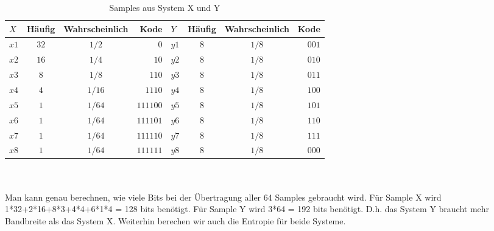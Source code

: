 \begin{table}[h]
  \begin{center}
    \begin{tabular}{lccrlccr}
      \toprule
      \bf $X$ & \bf H\"aufig & \bf Wahrscheinlich & \bf Kode 
   	& \bf $Y$ & \bf H\"aufig & \bf Wahrscheinlich & \bf Kode\\    
      \midrule     
      $x1$ 		&  $32$ 		 	& $1/2$  							& $0$	
    & $y1$		&  $8$ 		 		& $1/8$  							& $001$	\\
      $x2$ 		&  $16$ 			& $1/4$  							& $10$
    & $y2$		&  $8$ 		 		& $1/8$  							& $010$	\\
     	$x3$ 		&  $8$ 		 		& $1/8$  							& $110$	
    & $y3$		&  $8$ 		 		& $1/8$  							& $011$	\\
      $x4$ 		&  $4$ 				& $1/16$  						& $1110$
    & $y4$		&  $8$ 		 		& $1/8$  							& $100$	\\
     	$x5$ 		&  $1$ 		 		& $1/64$   						& $111100$	
    & $y5$		&  $8$ 		 		& $1/8$  							& $101$	\\
      $x6$ 		&  $1$ 				& $1/64$  						& $111101$
   	& $y6$		&  $8$ 		 		& $1/8$  							& $110$	\\
     	$x7$ 		&  $1$ 		 		& $1/64$  						& $111110$	
    & $y7$		&  $8$ 		 		& $1/8$  							& $111$	\\
      $x8$ 		&  $1$ 				& $1/64$  						& $111111$
    & $y8$		&  $8$ 		 		& $1/8$  							& $000$	\\     
      \bottomrule
    \end{tabular}
  \end{center}
\caption{Samples aus System X und Y}
\label{tab:table_2}
\end{table}
\\
\\
Man kann genau berechnen, wie viele Bits bei der \"Ubertragung aller 64 Samples gebraucht wird. F\"ur Sample X wird 1*32+2*16+8*3+4*4+6*1*4 = 128 bits ben\"otigt. F\"ur Sample Y wird 3*64 = 192 bits ben\"otigt. D.h. das System Y braucht mehr Bandbreite als das System X. Weiterhin berechen wir auch die Entropie f\"ur beide Systeme.

